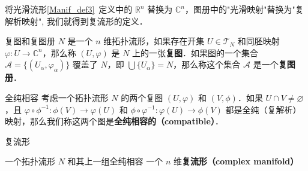 

将光滑流形\autoref{Manif_def3}~定义中的 $\mathbb{R}^n$ 替换为 $\mathbb{C}^n$，图册中的"光滑映射"替换为"复解析映射", 我们就得到复流形的定义．

\begin{definition}{复图和复图册}
$N$ 是一个 $n$ 维拓扑流形，如果存在开集 $U\in\mathcal{T}_N$ 和同胚映射 $\varphi: U \rightarrow \mathbb{C}^n$，那么称 $(U,\varphi)$ 是 $N$ 上的一张\textbf{复图}．如果图的一个集合 $\mathcal{A}=\{(U_\alpha, \varphi_\alpha)\}$ 覆盖了 $N$，即 $\bigcup\{U_\alpha\}=N$，那么称这个集合 $\mathcal{A}$ 是一个\textbf{复图册}．
\end{definition}


\begin{definition}{全纯相容}
考虑一个拓扑流形 $N$ 的两个复图 $(U, \varphi)$ 和 $(V, \phi)$．如果 $U \cap V \neq \varnothing$，且 $\varphi \circ \phi^{-1}: \phi(V) \rightarrow \varphi(U)$ 和 $\phi \circ \varphi^{-1}: \varphi(U) \rightarrow \phi(V)$ 都是全纯（复解析）映射，那么我们称这两个图是\textbf{全纯相容的（compatible）}．
\end{definition}

\begin{definition}{复流形}

一个拓扑流形 $N$ 和其上一组全纯相容
一个 $n$ 维\textbf{复流形（complex manifold）}

\end{definition}
